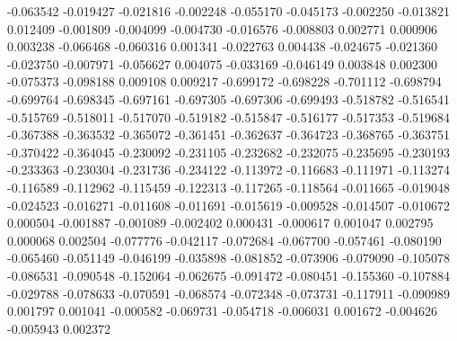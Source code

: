 -0.063542
-0.019427
-0.021816
-0.002248
-0.055170
-0.045173
-0.002250
-0.013821
0.012409
-0.001809
-0.004099
-0.004730
-0.016576
-0.008803
0.002771
0.000906
0.003238
-0.066468
-0.060316
0.001341
-0.022763
0.004438
-0.024675
-0.021360
-0.023750
-0.007971
-0.056627
0.004075
-0.033169
-0.046149
0.003848
0.002300
-0.075373
-0.098188
0.009108
0.009217
-0.699172
-0.698228
-0.701112
-0.698794
-0.699764
-0.698345
-0.697161
-0.697305
-0.697306
-0.699493
-0.518782
-0.516541
-0.515769
-0.518011
-0.517070
-0.519182
-0.515847
-0.516177
-0.517353
-0.519684
-0.367388
-0.363532
-0.365072
-0.361451
-0.362637
-0.364723
-0.368765
-0.363751
-0.370422
-0.364045
-0.230092
-0.231105
-0.232682
-0.232075
-0.235695
-0.230193
-0.233363
-0.230304
-0.231736
-0.234122
-0.113972
-0.116683
-0.111971
-0.113274
-0.116589
-0.112962
-0.115459
-0.122313
-0.117265
-0.118564
-0.011665
-0.019048
-0.024523
-0.016271
-0.011608
-0.011691
-0.015619
-0.009528
-0.014507
-0.010672
0.000504
-0.001887
-0.001089
-0.002402
0.000431
-0.000617
0.001047
0.002795
0.000068
0.002504
-0.077776
-0.042117
-0.072684
-0.067700
-0.057461
-0.080190
-0.065460
-0.051149
-0.046199
-0.035898
-0.081852
-0.073906
-0.079090
-0.105078
-0.086531
-0.090548
-0.152064
-0.062675
-0.091472
-0.080451
-0.155360
-0.107884
-0.029788
-0.078633
-0.070591
-0.068574
-0.072348
-0.073731
-0.117911
-0.090989
0.001797
0.001041
-0.000582
-0.069731
-0.054718
-0.006031
0.001672
-0.004626
-0.005943
0.002372
